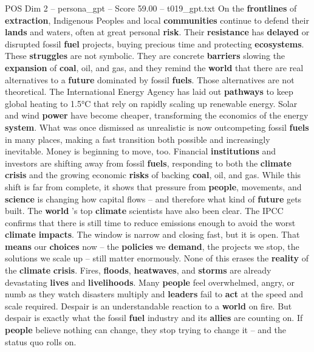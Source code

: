 \begin{textsample}{POS Dim 2 – persona\_gpt – Score 59.00 – t019\_gpt.txt}
On the \textbf{frontlines} of \textbf{extraction}, Indigenous Peoples and local \textbf{communities} continue to defend their \textbf{lands} and waters, often at great personal \textbf{risk}.
Their \textbf{resistance} has \textbf{delayed} or disrupted fossil \textbf{fuel} projects, buying precious time and protecting \textbf{ecosystems}.
These \textbf{struggles} are not symbolic.
They are concrete \textbf{barriers} slowing the \textbf{expansion} of \textbf{coal}, oil, and gas, and they remind the \textbf{world} that there are real alternatives to a \textbf{future} dominated by fossil \textbf{fuels}.
Those alternatives are not theoretical.
The International Energy Agency has laid out \textbf{pathways} to keep global heating to 1.5°C that rely on rapidly scaling up renewable energy.
Solar and wind \textbf{power} have become cheaper, transforming the economics of the energy \textbf{system}.
What was once dismissed as unrealistic is now outcompeting fossil \textbf{fuels} in many places, making a fast transition both possible and increasingly inevitable.
Money is beginning to move, too.
Financial \textbf{institutions} and investors are shifting away from fossil \textbf{fuels}, responding to both the \textbf{climate} \textbf{crisis} and the growing economic \textbf{risks} of backing \textbf{coal}, oil, and gas.
While this shift is far from complete, it shows that pressure from \textbf{people}, movements, and \textbf{science} is changing how capital flows – and therefore what kind of \textbf{future} gets built.
The \textbf{world} ’s top \textbf{climate} scientists have also been clear.
The IPCC confirms that there is still time to reduce emissions enough to avoid the worst \textbf{climate} \textbf{impacts}.
The window is narrow and closing fast, but it is open.
That \textbf{means} our \textbf{choices} now – the \textbf{policies} we \textbf{demand}, the projects we stop, the solutions we scale up – still matter enormously.
None of this erases the \textbf{reality} of the \textbf{climate} \textbf{crisis}.
Fires, \textbf{floods}, \textbf{heatwaves}, and \textbf{storms} are already devastating \textbf{lives} and \textbf{livelihoods}.
Many \textbf{people} feel overwhelmed, angry, or numb as they watch disasters multiply and \textbf{leaders} fail to \textbf{act} at the speed and scale required.
Despair is an understandable reaction to a \textbf{world} on fire.
But despair is exactly what the fossil \textbf{fuel} industry and its \textbf{allies} are counting on.
If \textbf{people} believe nothing can change, they stop trying to change it – and the status quo rolls on.

\end{textsample}
